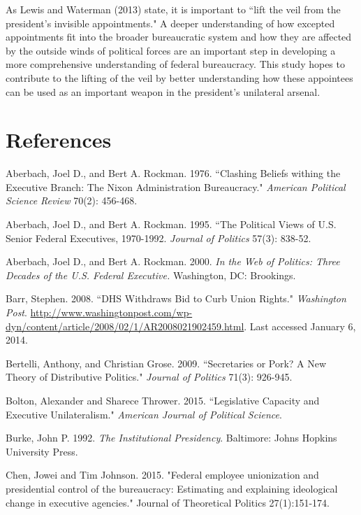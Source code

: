 \documentclass[12pt]{article}
\begin{document}
As Lewis and Waterman (2013) state, it is important to ``lift the veil from the president's invisible appointments." A deeper understanding of how excepted appointments fit into the broader bureaucratic system and how they are affected by the outside winds of political forces are an important step in developing a more comprehensive understanding of federal bureaucracy. This study hopes to contribute to the lifting of the veil by better understanding how these appointees can be used as an important weapon in the president's unilateral arsenal.

\section*{References}
\noindent \hangindent=0.7cm Aberbach, Joel D.,  and Bert A. Rockman. 1976. ``Clashing Beliefs withing the Executive Branch: The Nixon Administration Bureaucracy." \textit{American Political Science Review} 70(2): 456-468. 

\noindent \hangindent=0.7cm Aberbach, Joel D., and Bert A. Rockman. 1995. ``The Political Views of U.S. Senior Federal Executives, 1970-1992. \textit{Journal of Politics} 57(3): 838-52. 

\noindent \hangindent=0.7cm Aberbach, Joel D., and Bert A. Rockman. 2000. \textit{In the Web of Politics: Three Decades of the U.S. Federal Executive.} Washington, DC: Brookings.

\noindent \hangindent=0.7cm Barr, Stephen. 2008. ``DHS Withdraws Bid to Curb Union Rights." \textit{Washington Post}. \url{http://www.washingtonpost.com/wp-dyn/content/article/2008/02/1/AR2008021902459.html}. Last accessed January 6, 2014.

\noindent \hangindent=0.7cm Bertelli, Anthony, and Christian Grose. 2009. ``Secretaries or Pork? A New Theory of Distributive Politics." \textit{Journal of Politics} 71(3): 926-945. 

\noindent \hangindent=0.7cm Bolton, Alexander and Sharece Thrower. 2015. ``Legislative Capacity and Executive Unilateralism." \textit{American Journal of Political Science}. 

\noindent \hangindent=0.7cm Burke, John P. 1992. \textit{The Institutional Presidency}. Baltimore: Johns Hopkins University Press. 

\noindent \hangindent=0.7cm Chen, Jowei and Tim Johnson. 2015. "Federal employee unionization and presidential control of the bureaucracy: Estimating and explaining ideological change in executive agencies." Journal of Theoretical Politics 27(1):151-174.
\end{document}
